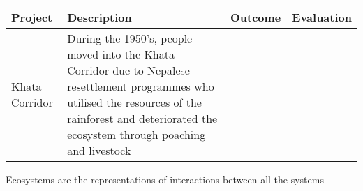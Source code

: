 	\begin{table}[H]
		\centering
		\begin{tabular}{p{3cm}|p{4.5cm}|p{4.5cm}|p{4.5cm}}
			\textbf{Project}	& \textbf{Description}		& \textbf{Outcome}		& \textbf{Evaluation}	\\ \hline
			Khata Corridor		& During the 1950's, people moved into the Khata Corridor due to Nepalese resettlement programmes who utilised the resources of the rainforest and deteriorated the ecosystem through poaching and livestock \\
		\end{tabular}
	\end{table}

	Ecosystems are the representations of interactions between all the systems
